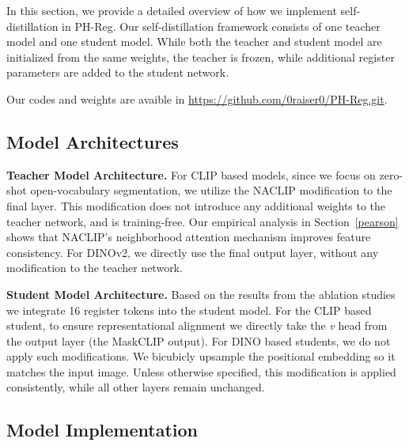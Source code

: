\renewcommand{\arraystretch}{1.2}


In this section, we provide a detailed overview of how we implement self-distillation in PH-Reg. Our self-distillation framework consists of one teacher model and one student model. While both the teacher and student model are initialized from the same weights, the teacher is frozen, while additional register parameters are added to the student network. 

 Our codes and weights are avaible in \hyperlink{https://github.com/0raiser0/PH-Reg.git}{https://github.com/0raiser0/PH-Reg.git}. 


\subsection{Model Architectures}
\label{model}
\textbf{Teacher Model Architecture.}
For CLIP based models, since we focus on zero-shot open-vocabulary segmentation, we utilize the NACLIP modification to the final layer. This modification does not introduce any additional weights to the teacher network, and is training-free. Our empirical analysis in Section~\ref{pearson} shows that NACLIP's neighborhood attention mechanism improves feature consistency. For DINOv2, we directly use the final output layer, without any modification to the teacher network.


\textbf{Student Model Architecture.}
Based on the results from the ablation studies we integrate 16 register tokens into the student model. For the CLIP based student, to ensure representational alignment we directly take the \emph{v} head from the output layer (the MaskCLIP output). For DINO based students, we do not apply such modifications. We bicubicly upsample the positional embedding so it matches the input image. Unless otherwise specified, this modification is applied consistently, while all other layers remain unchanged.

\subsection{Model Implementation}
\label{weights}

